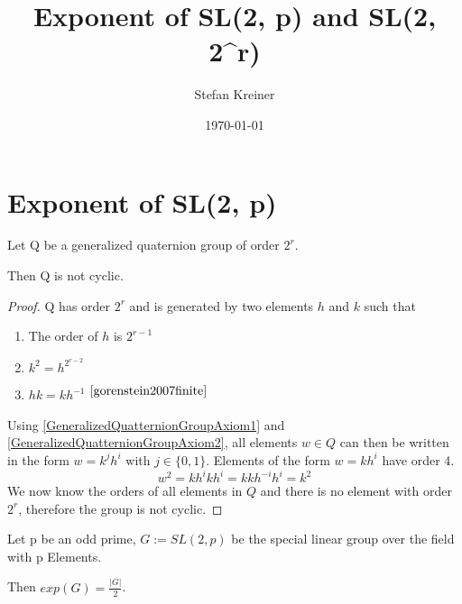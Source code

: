 \documentclass[a4paper,10pt]{article}
\title{Exponent of SL(2, p) and SL(2, 2^r)}
\author{Stefan Kreiner}
\date{\today}
\begin{document}
\tableofcontents

\section{Exponent of SL(2, p)}

\begin{lemma}
	Let Q be a generalized quaternion group of order $2^r$.

	Then Q is not cyclic.
\end{lemma}

\begin{proof}
	Q has order $2^r$ and is generated by two elements $h$ and $k$ such that
	\begin{enumerate}
		\item The order of $h$ is $2^{r-1}$ \label{GeneralizedQuatternionGroupAxiom1}
		\item $k^2 = h^{2^{r-2}}$ \label{GeneralizedQuatternionGroupAxiom2}
		\item $hk = kh^{-1}$ $^{\cite{gorenstein2007finite}}$ \label{GeneralizedQuatternionGroupAxiom3}
	\end{enumerate}
	Using \ref{GeneralizedQuatternionGroupAxiom1} and \ref{GeneralizedQuatternionGroupAxiom2}, all elements $w \in Q$ can then be written in the form $w = k^jh^i$ with $j \in \{0,1\}$. Elements of the form $w = kh^i$ have order 4. 
	\begin{equation}
		w^2 = kh^ikh^i = kkh^{-i}h^i = k^2
	\end{equation}
	We now know the orders of all elements in $Q$ and there is no element with order $2^r$, therefore the group is not cyclic.
\end{proof}

\begin{theorem}
	Let p be an odd prime, $G := SL(2, p)$ be the special linear group over the field with p Elements.

	Then $exp(G) = \frac{|G|}{2}$.
\end{theorem}
\end{document}
